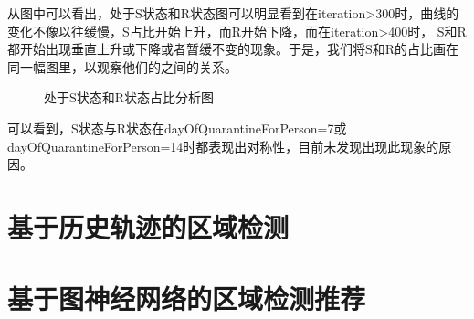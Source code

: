                 从图中可以看出，处于S状态和R状态图可以明显看到在iteration>300时，曲线的变化不像以往缓慢，S占比开始上升，而R开始下降，而在iteration>400时，
                S和R都开始出现垂直上升或下降或者暂缓不变的现象。于是，我们将S和R的占比画在同一幅图里，以观察他们的之间的关系。
                \begin{figure}[H]
                    \centering
                    \quad
                    \caption{处于S状态和R状态占比分析图}
                \end{figure}
                可以看到，S状态与R状态在dayOfQuarantineForPerson=7或dayOfQuarantineForPerson=14时都表现出对称性，目前未发现出现此现象的原因。
    \chapter{基于历史轨迹的区域检测}
    \chapter{基于图神经网络的区域检测推荐}


    
